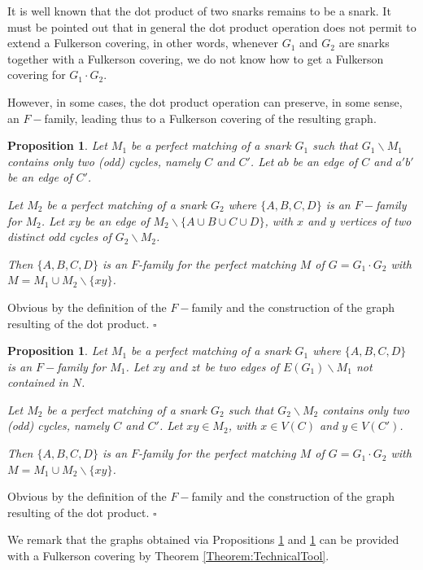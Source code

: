 \documentclass{amsart}
\newtheorem{prop}[thm]{Proposition}
\theoremstyle{definition}
\theoremstyle{remark}
\newenvironment{prf}{{\bf \noindent Proof } }{\hfill$\square$\\}
\begin{document}
It is well known that the dot product of two snarks remains to be a
snark. It must be pointed out that in general the dot product
operation does not permit to extend a Fulkerson covering, in other
words, whenever $G_1$ and $G_2$ are snarks together with a Fulkerson
covering, we do not know how to get a Fulkerson covering for $G_1
\cdot G_2$.


However, in some cases, the dot product operation can preserve, in
some sense, an $F-$family, leading thus to a Fulkerson covering of the
resulting graph.
\begin{prop}\label{Proposition:DotProduct_1}
Let $M_{1}$ be a perfect matching of a snark $G_1$ such that
$G_1\backslash M_1$ contains only two (odd) cycles, namely $C$ and
$C'$.  Let $ab$ be an edge of $C$ and $a'b'$ be an edge of $C'$.

Let $M_2$  be a perfect matching of a snark $G_2$ where  $\{A,B,C,D\}$ is an $F-$family for $M_2$.
Let $xy$ be an edge of $M_{2} \backslash \{A \cup B \cup C \cup
D\}$, with $x$ and $y$  vertices of two distinct odd cycles of
$G_2\backslash M_2$.

Then $\{A,B,C,D\}$ is an $F$-family for the perfect matching $M$ of
$G=G_1 \cdot G_2$ with $M=M_1\cup M_{2}\backslash \{xy\}$.
\end{prop}
\begin{prf}
Obvious by the definition of the $F-$family and the  construction of
the graph resulting of the dot product.
\end{prf}
\begin{prop}\label{Proposition:DotProduct_2}
Let $M_1$  be a perfect matching of a snark $G_1$ where  $\{A,B,C,D\}$ is an $F-$family for $M_1$.
Let $xy$ and $zt$ be two edges of $E(G_{1}) \backslash M_{1}$  not
contained in $N$.

Let $M_{2}$ be a perfect matching of a snark $G_2$ such that
$G_2\backslash M_2$ contains only two (odd) cycles, namely $C$ and
$C'$. Let $xy \in M_{2}$, with $x \in V(C)$ and $y \in V(C')$.


Then $\{A,B,C,D\}$ is an $F$-family for the perfect matching $M$ of
$G=G_1 \cdot G_2$ with $M=M_1\cup M_{2}\backslash \{xy\}$.
\end{prop}
\begin{prf}
Obvious by the definition of the $F-$family and the  construction of
the graph resulting of the dot product.
\end{prf}

We remark that the graphs obtained via Propositions
\ref{Proposition:DotProduct_1} and \ref{Proposition:DotProduct_2}
can be provided with a Fulkerson covering by Theorem
\ref{Theorem:TechnicalTool}. 
\end{document}

